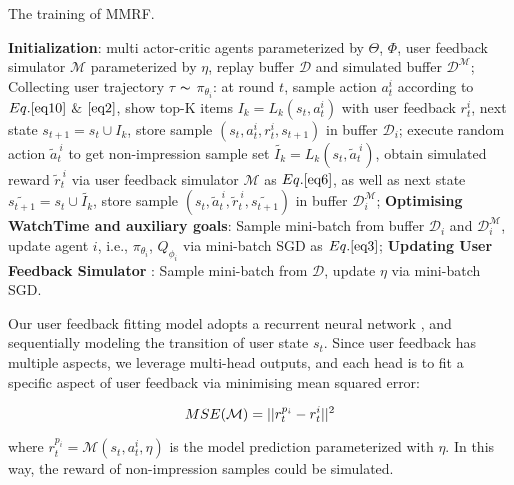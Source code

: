 \begin{algorithm}
\small
\caption{The training of MMRF.}
\label{alg1}
\begin{algorithmic}[1]
\STATE \textbf{Initialization}: multi actor-critic agents parameterized by $\Theta$, $\Phi$, user feedback simulator $\mathcal{M}$ parameterized by $\eta$, replay buffer $\mathcal{D}$ and simulated buffer $\mathcal{D}^{\mathcal{M}}$; \\
\REPEAT
        \STATE Collecting user trajectory $\tau$ $\thicksim$ $\pi_{\theta_i}$: at round $t$, sample action $a_t^i$ according to $Eq.\ref{eq10}$ $\&$ $\ref{eq2}$, show top-K items $I_k = L_k(s_t, a_t^i)$ with user feedback $r_t^i$, next state $s_{t+1} = s_t \cup I_k$, store sample $(s_t, a_t^i, r_t^i, s_{t+1})$ in buffer $\mathcal{D}_i$;
            \STATE execute random action $\widetilde{a}_t^{\ i}$ to get non-impression sample set $\widetilde{I_k} = L_k(s_t, \widetilde{a}_t^{\ i})$, obtain simulated reward $\widetilde{r}_t^{\ i}$ via user feedback simulator $\mathcal{M}$ as $Eq.\ref{eq6}$, as well as next state $\widetilde{s_{t+1}} = s_t \cup \widetilde{I_k}$, store sample $(s_t, \widetilde{a}_t^{\ i}, \widetilde{r}_t^{\ i}, \widetilde{s_{t+1}})$ in buffer $\mathcal{D}_i^{\mathcal{M}}$;
        \ENDFOR
    \ENDFOR
    \STATE \textbf{Optimising WatchTime and auxiliary goals}: Sample mini-batch from buffer $\mathcal{D}_i$ and $\mathcal{D}_i^{\mathcal{M}}$, update agent $i$, i.e., $\pi_{\theta_i}$, $Q_{\phi_i}$ via mini-batch SGD as $Eq.\ref{eq3}$;
    \STATE \textbf{Updating User Feedback Simulator} : Sample mini-batch from $\mathcal{D}$, update $\eta$ via mini-batch SGD.
\end{algorithmic}  
\end{algorithm}

Our user feedback fitting model adopts a recurrent neural network \cite{UserBehaviorModel2019}, and sequentially modeling  the transition of user state $s_t$. Since user feedback has multiple aspects, we leverage multi-head outputs, and each head is to fit a specific aspect of user feedback via minimising mean squared error:
\begin{small}
\begin{equation}
\setlength{\abovedisplayskip}{1pt}
MSE(\mathcal{M}) = ||r_t^{p_i} - r_t^i||^2
\setlength{\belowdisplayskip}{1pt}
\end{equation}
\end{small}
where $r_t^{p_i} = \mathcal{M}(s_t,a_t^i,\eta)$ is the model prediction parameterized with $\eta$. In this way, the reward of non-impression samples could be simulated. 


